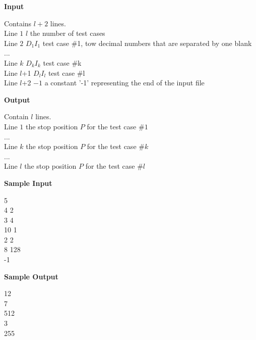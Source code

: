 \begin{flushleft}
{\color{red} \textbf{Input}}
\end{flushleft}
\begin{flushleft}
Contains $l+2$ lines.\\
Line $1$ \quad $l$ \quad the number of test cases\\
Line $2$ \quad $D_1 I_1$ \quad test case \#1, tow decimal numbers that are separated by one blank\\
...\\
Line $k$ \quad $D_k I_k$ \quad test case \#k\\
Line $l$+1 \quad $D_l I_l$ \quad test case \#l\\
Line $l$+2 \quad $-1$ \quad a constant '-1' representing the end of the input file\\
\end{flushleft}

\begin{flushleft}
{\color{red} \textbf{Output}}
\end{flushleft}
\begin{flushleft}
Contain $l$ lines.\\
Line $1$ \quad the stop position $P$ for the test case $\#1$\\
...\\
Line $k$ \quad the stop position $P$ for the test case $\#k$\\
...\\
Line $l$ \quad the stop position $P$ for the test case $\#l$\\
\end{flushleft}

\begin{flushleft}
{\color{red} \textbf{Sample Input}}
\end{flushleft}
\begin{flushleft}
5\\
4 2\\
3 4\\
10 1\\
2 2\\
8 128\\
-1\\
\end{flushleft}

\begin{flushleft}
{\color{red} \textbf{Sample Output}}
\end{flushleft}
\begin{flushleft}
12\\
7\\
512\\
3\\
255\\
\end{flushleft}

\newpage
